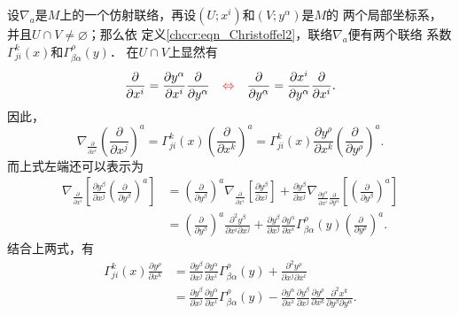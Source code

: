 设$\nabla_a$是$M$上的一个仿射联络，再设$(U;x^i)$和$(V;y^\alpha)$是$M$的
两个局部坐标系，并且$U\cap V \neq \varnothing$；那么依
定义\eqref{chccr:eqn_Christoffel2}，联络$\nabla_a$便有两个联络
系数$\Gamma^{k}_{ji}(x)$和$\Gamma^{\rho}_{\beta\alpha}(y)$．
在$U\cap V$上显然有
\begin{equation}
    \frac{\partial }{\partial x^i} = \frac{\partial y^\alpha}{\partial x^i}
    \frac{\partial }{\partial y^\alpha} {\quad \color{red}\Leftrightarrow \quad }
    \frac{\partial }{\partial y^\alpha} = \frac{\partial x^i} {\partial y^\alpha}
    \frac{\partial }{\partial x^i} .
\end{equation}
因此，
\begin{equation*}
    \nabla_{\frac{\partial }{\partial x^i}}\left(\frac{\partial }{\partial x^j}\right) ^a
    =\Gamma^{k}_{ji}(x) \left(\frac{\partial }{\partial x^k}\right) ^a
    =\Gamma^{k}_{ji}(x) \frac{\partial y^\rho}{\partial x^k}
    \left(\frac{\partial }{\partial y^\rho}\right)^a .
\end{equation*}
而上式左端还可以表示为
\begin{align*}
    \nabla_{\frac{\partial }{\partial x^i}}
    \left[\frac{\partial y^\beta}{\partial x^j}
    \left(\frac{\partial }{\partial y^\beta}\right)^a\right]
    &=\left(\frac{\partial }{\partial y^\beta}\right)^a
    \nabla_{\frac{\partial }{\partial x^i}}
    \left[\frac{\partial y^\beta}{\partial x^j} \right]
    +\frac{\partial y^\beta}{\partial x^j}
    \nabla_{\frac{\partial y^\alpha}{\partial x^i}
        \frac{\partial }{\partial y^\alpha} }
    \left[\left(\frac{\partial }{\partial y^\beta}\right)^a\right]  \\
    &=\left(\frac{\partial }{\partial y^\beta}\right)^a
    \frac{\partial^2 y^\beta}{\partial x^i \partial x^j}
    +\frac{\partial y^\beta}{\partial x^j} \frac{\partial y^\alpha}{\partial x^i}
    \Gamma^{\rho}_{\beta\alpha}(y)
    \left(\frac{\partial }{\partial y^\rho}\right)^a  .
\end{align*}
结合上两式，有
\begin{subequations}\label{chccr:eqn_Exchange-Christoffel}
    \begin{align}
        \Gamma^{k}_{ji}(x) \frac{\partial y^\rho}{\partial x^k} &=
        \frac{\partial y^\beta}{\partial x^j} \frac{\partial y^\alpha}{\partial x^i}
        \Gamma^{\rho}_{\beta\alpha}(y) + \frac{\partial^2 y^\rho}{\partial x^j \partial x^i}
          \label{chccr:eqn_Exchange-Christoffel-a}\\
        &= \frac{\partial y^\beta}{\partial x^j} \frac{\partial y^\alpha}{\partial x^i}
        \Gamma^{\rho}_{\beta\alpha}(y)
        -\frac{\partial y^\alpha }{\partial {x^i}}\frac{\partial {y^\beta }}{\partial {x^j}}
        \frac{\partial {y^\rho }}{\partial {x^k}}\frac{{{\partial ^2}{x^k}}}
        {\partial {y^\beta }\partial {y^\alpha }} . \label{chccr:eqn_Exchange-Christoffel-b}
    \end{align}
\end{subequations}
